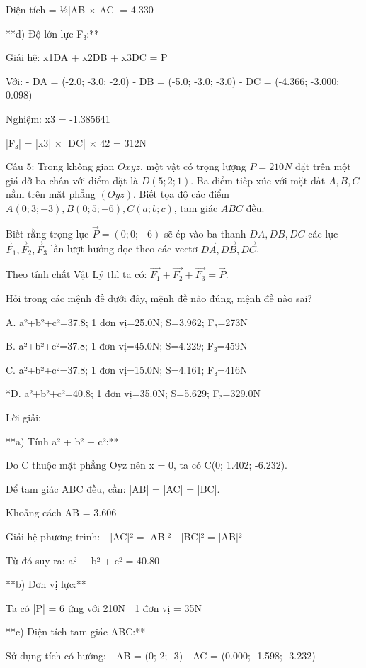 \documentclass[a4paper,12pt]{article}
\begin{document}
Diện tích = ½|AB⃗ × AC⃗| = 4.330

**d) Độ lớn lực F₃:**

Giải hệ: x1DA⃗ + x2DB⃗ + x3DC⃗ = P⃗

Với:
- DA⃗ = (-2.0; -3.0; -2.0)
- DB⃗ = (-5.0; -3.0; -3.0)
- DC⃗ = (-4.366; -3.000; 0.098)

Nghiệm: x3 = -1.385641

|F₃| = |x3| × |DC⃗| × 42 = 312N




Câu 5: Trong không gian \(Oxyz\), một vật có trọng lượng \(P=210N\) đặt trên một giá đỡ ba chân với điểm đặt là \(D(5; 2; 1)\). Ba điểm tiếp xúc với mặt đất \(A, B, C\) nằm trên mặt phẳng \((Oyz)\). Biết tọa độ các điểm \(A(0; 3; -3), B(0; 5; -6), C(a; b; c)\), tam giác \(ABC\) đều. 

Biết rằng trọng lực \(\overrightarrow{P}=(0; 0; -6)\) sẽ ép vào ba thanh \(DA, DB, DC\) các lực \(\overrightarrow{F}_1, \overrightarrow{F}_2, \overrightarrow{F}_3\) lần lượt hướng dọc theo các vectơ \(\overrightarrow{DA}, \overrightarrow{DB}, \overrightarrow{DC}\). 

Theo tính chất Vật Lý thì ta có: \(\overrightarrow{F_1}+\overrightarrow{F_2}+\overrightarrow{F_3}=\overrightarrow{P}\).

Hỏi trong các mệnh đề dưới đây, mệnh đề nào đúng, mệnh đề nào sai?

A. a²+b²+c²=37.8; 1 đơn vị=25.0N; S=3.962; F₃=273N

B. a²+b²+c²=37.8; 1 đơn vị=45.0N; S=4.229; F₃=459N

C. a²+b²+c²=37.8; 1 đơn vị=15.0N; S=4.161; F₃=416N

*D. a²+b²+c²=40.8; 1 đơn vị=35.0N; S=5.629; F₃=329.0N

Lời giải:


**a) Tính a² + b² + c²:**

Do C thuộc mặt phẳng Oyz nên x = 0, ta có C(0; 1.402; -6.232).

Để tam giác ABC đều, cần: |AB| = |AC| = |BC|.

Khoảng cách AB = 3.606

Giải hệ phương trình:
- |AC|² = |AB|²  
- |BC|² = |AB|²

Từ đó suy ra: a² + b² + c² = 40.80

**b) Đơn vị lực:**

Ta có |P⃗| = 6 ứng với 210N
⟹ 1 đơn vị = 35N

**c) Diện tích tam giác ABC:**

Sử dụng tích có hướng:
- AB⃗ = (0; 2; -3)
- AC⃗ = (0.000; -1.598; -3.232)
\end{document}
